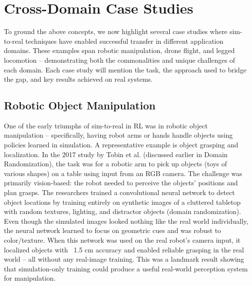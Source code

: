 \section{Cross-Domain Case Studies}
To ground the above concepts, we now highlight several case studies where sim-to-real techniques have enabled successful transfer in different application domains. These examples span robotic manipulation, drone flight, and legged locomotion – demonstrating both the commonalities and unique challenges of each domain. Each case study will mention the task, the approach used to bridge the gap, and key results achieved on real systems.

\subsection{Robotic Object Manipulation}
One of the early triumphs of sim-to-real in RL was in robotic object manipulation – specifically, having robot arms or hands handle objects using policies learned in simulation. A representative example is object grasping and localization. In the 2017 study by Tobin et al. (discussed earlier in Domain Randomization), the task was for a robotic arm to pick up objects (toys of various shapes) on a table using input from an RGB camera. The challenge was primarily vision-based: the robot needed to perceive the objects’ positions and plan grasps. The researchers trained a convolutional neural network to detect object locations by training entirely on synthetic images of a cluttered tabletop with random textures, lighting, and distractor objects (domain randomization). Even though the simulated images looked nothing like the real world individually, the neural network learned to focus on geometric cues and was robust to color/texture. When this network was used on the real robot’s camera input, it localized objects with ~1.5 cm accuracy and enabled reliable grasping in the real world – all without any real-image training. This was a landmark result showing that simulation-only training could produce a useful real-world perception system for manipulation.

